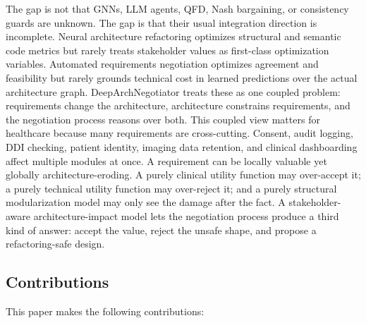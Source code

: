 \documentclass[english,preprint,nonatbib]{elsarticle}
\begin{document}
The gap is not that GNNs, LLM agents, QFD, Nash bargaining, or consistency guards are unknown.
The gap is that their usual integration direction is incomplete.
Neural architecture refactoring optimizes structural and semantic code metrics but rarely treats stakeholder values as first-class optimization variables.
Automated requirements negotiation optimizes agreement and feasibility but rarely grounds technical cost in learned predictions over the actual architecture graph.
DeepArchNegotiator treats these as one coupled problem: requirements change the architecture, architecture constrains requirements, and the negotiation process reasons over both.
This coupled view matters for healthcare because many requirements are cross-cutting.
Consent, audit logging, DDI checking, patient identity, imaging data retention, and clinical dashboarding affect multiple modules at once.
A requirement can be locally valuable yet globally architecture-eroding. A purely clinical utility function may over-accept it;
a purely technical utility function may over-reject it; and a purely structural modularization model may only see the damage after the fact.
A stakeholder-aware architecture-impact model lets the negotiation process produce a third kind of answer: accept the value, reject the unsafe shape, and propose a refactoring-safe design.

\subsection{Contributions}
\label{sec:contributions}

This paper makes the following contributions:
\end{document}
